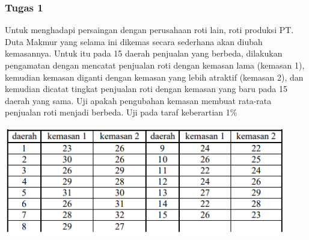 \documentclass[a4paper,12pt]{article}
\begin{document}
\subsubsection{Tugas 1}
Untuk menghadapi persaingan dengan perusahaan roti lain, roti produksi PT. Duta Makmur yang selama ini dikemas secara sederhana akan diubah kemasannya. Untuk itu pada 15 daerah penjualan yang
berbeda, dilakukan pengamatan dengan mencatat penjualan roti dengan kemasan lama (kemasan 1), kemudian kemasan diganti dengan kemasan yang lebih atraktif (kemasan 2), dan kemudian dicatat
tingkat penjualan roti dengan kemasan yang baru pada 15 daerah yang sama. Uji apakah pengubahan kemasan membuat
rata-rata penjualan roti menjadi berbeda. Uji pada taraf keberartian 1\%
\begin{center}
    \includegraphics[scale = .6]{table.png}
\end{center}
\end{document}
